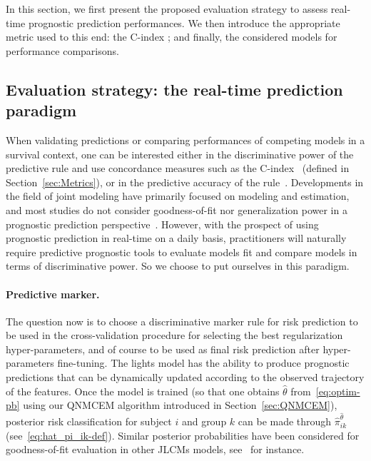 \documentclass[11pt]{article}
\begin{document}
In this section, we first present the proposed evaluation strategy to assess real-time prognostic prediction performances. We then introduce the appropriate metric used to this end: the C-index ; and finally, the considered models for performance comparisons.

\subsection{Evaluation strategy: the real-time prediction paradigm}
\label{sec:evaluation strategy}

When validating predictions or comparing performances of competing models in a survival context, one can be interested either in the discriminative power of the predictive rule and use concordance measures such as the C-index~\citep{heagerty2005survival} (defined in Section~\ref{sec:Metrics}), or in the predictive accuracy of the rule~\citep{schemper2000predictive}.
Developments in the field of joint modeling have primarily focused on modeling and estimation, and most studies do not consider goodness-of-fit nor generalization power in a prognostic prediction perspective~\citep{hickey2016joint}. However, with the prospect of using prognostic prediction in real-time on a daily basis, practitioners will naturally require predictive prognostic tools to evaluate models fit and compare models in terms of discriminative power. So we choose to put ourselves in this paradigm.

\paragraph{Predictive marker.}

The question now is to choose a discriminative marker rule for risk prediction to be used in the cross-validation procedure for selecting the best regularization hyper-parameters, and of course to be used as final risk prediction after hyper-parameters fine-tuning.
The lights model has the ability to produce prognostic predictions that can be dynamically updated according to the observed trajectory of the features. 
Once the model is trained (so that one obtains $\hat\theta$ from~\eqref{eq:optim-pb} using our QNMCEM algorithm introduced in Section~\ref{sec:QNMCEM}), posterior risk classification for subject $i$ and group $k$ can be made through $\hat \pi_{ik}^{\hat\theta}$ (see~\eqref{eq:hat_pi_ik-def}). Similar posterior probabilities have been considered for goodness-of-fit evaluation in other JLCMs models, see~\citet{proust2014joint} for instance.
\end{document}
